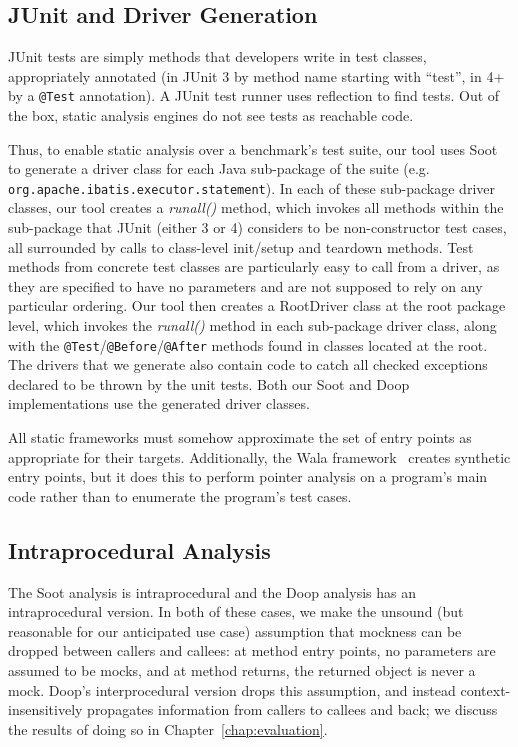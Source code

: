 \subsection{JUnit and Driver Generation}

JUnit tests are simply methods that developers write in test classes, appropriately annotated (in JUnit 3 by method name starting with ``test'', in 4+ by a \texttt{@Test} annotation). A JUnit test runner uses reflection to find tests. Out of the box, static analysis engines do not see tests as reachable code.


Thus, to enable static analysis over a benchmark's test suite, our tool uses Soot to generate a driver class for each Java sub-package of the suite (e.g. \\ \texttt{org.apache.ibatis.executor.statement}). In each of these sub-package driver classes, our tool creates a \textit{runall()} method, which invokes all methods within the sub-package that JUnit (either 3 or 4) considers to be non-constructor test cases, all surrounded by calls to class-level init/setup and teardown methods. Test methods from concrete test classes are particularly easy to call from a driver, as they are specified to have no parameters and are not supposed to rely on any particular ordering. 
Our tool then creates a RootDriver class at the root package level, which invokes the \textit{runall()} method in each sub-package driver class, along with the \texttt{@Test}/\texttt{@Before}/\texttt{@After} methods found in classes located at the root. The drivers that we generate also contain code to catch all checked exceptions declared to be thrown by the unit tests. Both our Soot and Doop implementations use the generated driver classes.

All static frameworks must somehow approximate the set of entry points as appropriate for their targets. Additionally, the Wala framework~\cite{wala19:_t} creates synthetic entry points, but it does this to perform pointer analysis on a program's main code rather than to enumerate the program's test cases.

\subsection{Intraprocedural Analysis} 

The Soot analysis is intraprocedural and the Doop analysis has an intraprocedural version. In both of these cases, we make the unsound (but reasonable for our anticipated use case) assumption that mockness can be dropped between callers and callees: at method entry points, no parameters are assumed to be mocks, and at method returns, the returned object is never a mock. Doop's interprocedural version drops this assumption, and instead context-insensitively propagates information from callers to callees and back; we discuss the results of doing so in Chapter~\ref{chap:evaluation}.

